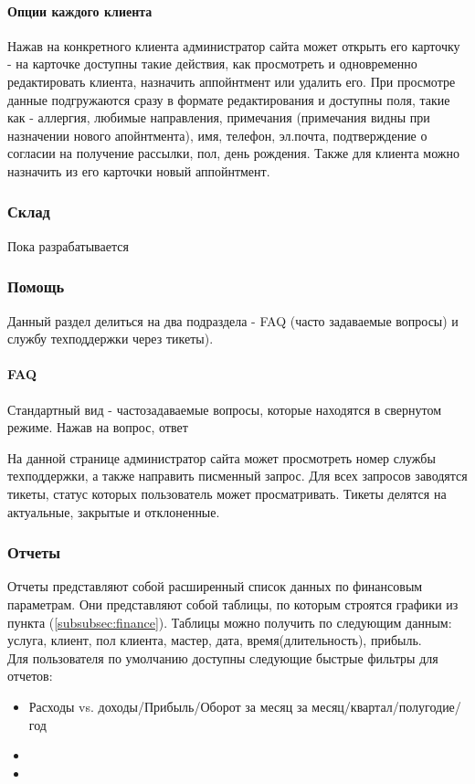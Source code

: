 \documentclass[DIV=calc, paper=a4, fontsize=11pt]{scrartcl} %
\begin{document}
\paragraph{Опции каждого клиента} Нажав на конкретного клиента администратор сайта может открыть его карточку - на карточке доступны такие действия, как просмотреть и одновременно редактировать клиента, назначить аппойнтмент или удалить его. При просмотре данные подгружаются сразу в формате редактирования и доступны поля, такие как - аллергия, любимые направления, примечания (примечания видны при назначении нового апойнтмента), имя, телефон, эл.почта, подтверждение о согласии на получение рассылки, пол, день рождения. Также для клиента можно назначить из его карточки новый аппойнтмент.

\subsubsection{Склад} \label{subsec:warehouse}
Пока разрабатывается

\subsubsection{Помощь}
Данный раздел делиться на два подраздела - FAQ (часто задаваемые вопросы) и службу техподдержки через тикеты). 

\paragraph{FAQ}
Стандартный вид - частозадаваемые вопросы, которые находятся в свернутом режиме. Нажав на вопрос, ответ 

На данной странице администратор сайта может просмотреть номер службы техподдержки, а также направить писменный запрос. Для всех запросов заводятся тикеты, статус которых пользователь может просматривать. Тикеты делятся на актуальные, закрытые и отклоненные.

\subsubsection{Отчеты}
Отчеты представляют собой расширенный список данных по финансовым параметрам. Они представляют собой таблицы, по которым строятся графики из пункта (\ref{subsubsec:finance}). Таблицы можно получить по следующим данным: услуга, клиент, пол клиента, мастер, дата, время(длительность), прибыль. 
\\[0.5cm]
Для пользователя по умолчанию доступны следующие быстрые фильтры для отчетов: 
    \begin{itemize}
        \item Расходы vs. доходы/Прибыль/Оборот за месяц за месяц/квартал/полугодие/год
        \item 
        \item 
    \end{itemize}
\end{document}
